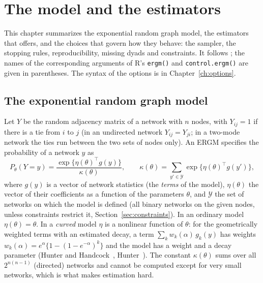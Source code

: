 \chapter{The model and the estimators}\label{ch:model}

This chapter summarizes the exponential random graph model, the estimators that \nwergm{} offers, and the choices that govern how they behave: the sampler, the stopping rules, reproducibility, missing dyads and constraints. It follows \ergm{}; the names of the corresponding arguments of R's \texttt{ergm()} and \texttt{control.ergm()} are given in parentheses. The syntax of the options is in Chapter~\ref{ch:options}.

\section{The exponential random graph model}\label{sec:ergmdef}

Let $Y$ be the random adjacency matrix of a network with $n$ nodes, with $Y_{ij}=1$ if there is a tie from $i$ to $j$ (in an undirected network $Y_{ij}=Y_{ji}$; in a two-mode network the ties run between the two sets of nodes only). An ERGM specifies the probability of a network $y$ as
\begin{equation}\label{eq:ergm}
  P_\theta(Y=y)=\frac{\exp\{\eta(\theta)^{\top}g(y)\}}{\kappa(\theta)},\qquad
  \kappa(\theta)=\sum_{y'\in\mathcal{Y}}\exp\{\eta(\theta)^{\top}g(y')\},
\end{equation}
where $g(y)$ is a vector of network statistics (the \emph{terms} of the model), $\eta(\theta)$ the vector of their coefficients as a function of the parameters $\theta$, and $\mathcal{Y}$ the set of networks on which the model is defined (all binary networks on the given nodes, unless constraints restrict it, Section~\ref{sec:constraints}). In an ordinary model $\eta(\theta)=\theta$. In a \emph{curved} model $\eta$ is a nonlinear function of $\theta$: for the geometrically weighted terms with an estimated decay, a term $\sum_k w_k(\alpha)\,g_k(y)$ has weights $w_k(\alpha)=e^{\alpha}\{1-(1-e^{-\alpha})^{k}\}$ and the model has a weight and a decay parameter (Hunter and Handcock~\cite{hunter2006}, Hunter~\cite{hunter2007}). The constant $\kappa(\theta)$ sums over all $2^{n(n-1)}$ (directed) networks and cannot be computed except for very small networks, which is what makes estimation hard.

